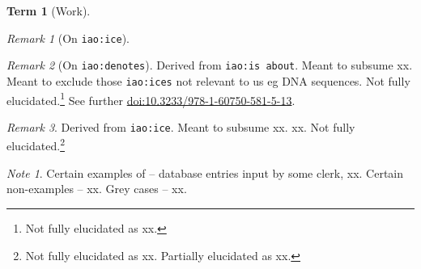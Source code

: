 \documentclass{amsart}%
\newcommand{\code}[1]{\texttt{#1}}%
\theoremstyle{plain}
\theoremstyle{definition}
\theoremstyle{remark}
\newtheorem*{note}{Note}
\theoremstyle{definition}
\newtheorem{term}{Term}[subsection]%
\theoremstyle{remark}
\newtheorem*{term-note}{Remark}
\begin{document}
\begin{term}[Work]
\begin{term-note}[On \code{iao:ice}]
\end{term-note}
\begin{term-note}[On \code{iao:denotes}]
Derived from \code{iao:is about}. Meant to subsume xx. Meant to exclude those \code{iao:ices} not relevant to us eg DNA sequences. Not fully elucidated.\footnote{Not fully elucidated as xx.} See further \href{https://doi.org/10.3233/978-1-60750-581-5-13}{doi:10.3233/978-1-60750-581-5-13}.
\end{term-note}
\begin{term-note}
Derived from \code{iao:ice}. Meant to subsume xx. xx. Not fully elucidated.\footnote{Not fully elucidated as xx. Partially elucidated as xx.}
\end{term-note}
\begin{note}
Certain examples of -- database entries input by some clerk, xx. Certain non-examples -- xx. Grey cases -- xx.%
\end{note}
\end{term}
%
%
%
%
%
\end{document}
